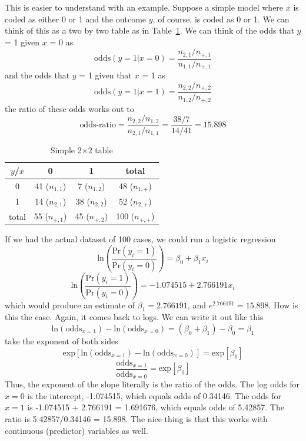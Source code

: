 This is easier to understand with an example. Suppose a simple model where $x$ is coded as either 0 or 1 and the outcome $y$, of course, is coded as 0 or 1. We can think of this as a two by two table as in Table~\ref{tab:2by2}. We can think of the odds that $y$ = 1 given $x$ = 0 as
\begin{equation}
\mbox{odds}\left(y = 1| x = 0\right) = \frac{n_{2,1}/n_{+,1}}{n_{1,1}/n_{+,1}}
\end{equation}
and the odds that $y$ = 1 given that $x$ = 1 as
\begin{equation}
\mbox{odds}\left(y = 1| x = 1\right) = \frac{n_{2,2}/n_{+,2}}{n_{1,2}/n_{+,2}}
\end{equation}
the ratio of these odds works out to
\begin{equation}
\mbox{odds-ratio} = \frac{n_{2,2}/n_{1,2}}{n_{2,1}/n_{1,1}} = \frac{38/7}{14/41} = 15.898
\end{equation}

\begin{table}[htbp]\centering
\caption{Simple 2$\times$2 table \label{tab:2by2}
\textbf{} }\begin{tabular} {@{} cccc @{}} \\
$y$/$x$ & 0 & 1 & total \\ \hline
0 & 41 ($n_{1,1}$) & 7 ($n_{1,2}$) & 48 ($n_{1,+}$) \\
1 & 14 ($n_{2,1}$) & 38 ($n_{2,2}$) & 52 ($n_{2,+}$) \\ \hline
total & 55 ($n_{+,1}$) & 45 ($n_{+,2}$) & 100 ($n_{+,+}$) \\
\end{tabular}
\end{table}

If we had the actual dataset of 100 cases, we could run a logistic regression
\[
\mbox{ln}\left(\frac{\mbox{Pr}\left(y_i = 1\right)}{\mbox{Pr}\left(y_i = 0\right)}\right)=\beta_0 + \beta_1x_i
\]
\[
\mbox{ln}\left(\frac{\mbox{Pr}\left(y_i = 1\right)}{\mbox{Pr}\left(y_i = 0\right)}\right)=-1.074515 + 2.766191x_i
\]
which would produce an estimate of $\beta_1 = 2.766191$, and $e^{2.766191}=15.898$. How is this the case. Again, it comes back to logs. We can write it out like this
\[
\mbox{ln}\left(\mbox{odds}_{x=1}\right) - \mbox{ln}\left(\mbox{odds}_{x=0}\right) = \left(\beta_0+\beta_1\right) - \beta_0 = \beta_1
\]
take the exponent of both sides
\[
\mbox{exp}\left[\mbox{ln}\left(\mbox{odds}_{x=1}\right) - \mbox{ln}\left(\mbox{odds}_{x=0}\right)\right] = \mbox{exp}\left[\beta_1\right]
\]
\begin{equation}\label{eq:oddsratio}
\frac{\mbox{odds}_{x=1}}{\mbox{odds}_{x=0}} = \mbox{exp}\left[\beta_1\right]
\end{equation}
Thus, the exponent of the slope literally is the ratio of the odds. The log odds for $x=0$ is the intercept, -1.074515, which equals odds of 0.34146. The odds for $x=1$ is -1.074515 + 2.766191 = 1.691676, which equals odds of 5.42857. The ratio is 5.42857/0.34146 = 15.898. The nice thing is that this works with continuous (predictor) variables as well.

